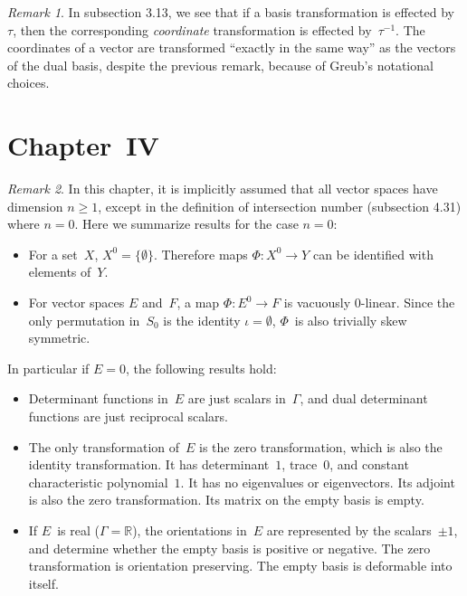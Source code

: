 \documentclass[letterpaper,12pt]{article}
\newcommand{\R}{\mathbb{R}}
\theoremstyle{definition}
\theoremstyle{remark}
\newtheorem*{rmk}{Remark}
\begin{document}
\begin{rmk}
In subsection 3.13, we see that if a basis transformation is effected by~\(\tau\), then the corresponding \emph{coordinate} transformation is effected by~\(\tau^{-1}\). The coordinates of a vector are transformed ``exactly in the same way'' as the vectors of the dual basis, despite the previous remark, because of Greub's notational choices.
\end{rmk}

\section*{Chapter~IV}
\begin{rmk}
In this chapter, it is implicitly assumed that all vector spaces have dimension \(n\ge 1\), except in the definition of intersection number (subsection 4.31) where \(n=0\). Here we summarize results for the case \(n=0\):
\begin{itemize}
\item For a set~\(X\), \(X^0=\{\emptyset\}\). Therefore maps \(\Phi:X^0\to Y\) can be identified with elements of~\(Y\).
\item For vector spaces \(E\) and~\(F\), a map \(\Phi:E^0\to F\) is vacuously \(0\)-linear. Since the only permutation in~\(S_0\) is the identity \(\iota=\emptyset\), \(\Phi\)~is also trivially skew symmetric.
\end{itemize}
In particular if \(E=0\), the following results hold:
\begin{itemize}
\item Determinant functions in~\(E\) are just scalars in~\(\Gamma\), and dual determinant functions are just reciprocal scalars.
\item The only transformation of~\(E\) is the zero transformation, which is also the identity transformation. It has determinant~\(1\), trace~\(0\), and constant characteristic polynomial~\(1\). It has no eigenvalues or eigenvectors. Its adjoint is also the zero transformation. Its matrix on the empty basis is empty.
\item If \(E\)~is real (\(\Gamma=\R\)), the orientations in~\(E\) are represented by the scalars~\(\pm 1\), and determine whether the empty basis is positive or negative. The zero transformation is orientation preserving. The empty basis is deformable into itself.
\end{itemize}
\end{rmk}
\end{document}
